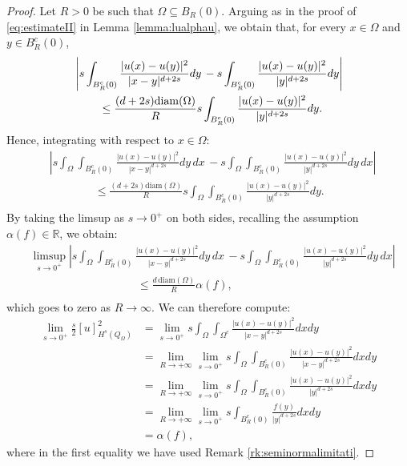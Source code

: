 \documentclass[reqno,11pt]{amsart}
\numberwithin{equation}{section}
\theoremstyle{definition} %
\theoremstyle{plain}
\theoremstyle{definition}
\theoremstyle{remark}
\def\sub{\subseteq}
\def\Qom{{Q_\Omega}}
\def\O{\Omega}
\def\semin#1#2{ [#1 ]_{#2}}
\def\R{\mathbb{R}}
\begin{document}
\begin{proof}%

Let $R>0$ be such that $\O\sub B_R(0)$. Arguing as in the proof of \eqref{eq:estimateII} in Lemma \ref{lemma:lualphau}, we obtain that, for every $x\in \O$ and $y\in B_R^c(0)$,
\begin{align*}
        &\left|s\int_{B_R^c(0)}\frac{|u(x)-u(y)|^2}{|x-y|^{d+2s}}dy\,-s\int_{B_R^c(0)}\frac{|u(x)-u(y)|^2}{|y|^{d+2s}}dy\right|\\&\hspace{8mm}\leq\frac{(d+2s)\mathrm{diam}(\O)}{R}s\int_{B_R^c(0)}\frac{|u(x)-u(y)|^2}{|y|^{d+2s}}dy.
\end{align*}
Hence, integrating with respect to $x\in\O$:
\begin{align*}
    &\left|s\int_\O\int_{B_R^c(0)}\frac{|u(x)-u(y)|^2}{|x-y|^{d+2s}}dy\,dx\,-s\int_\O\int_{B_R^c(0)}\frac{|u(x)-u(y)|^2}{|y|^{d+2s}}dy\,dx\right|\\&\qquad\qquad\leq\frac{(d+2s)\mathrm{diam}(\O)}{R}s\int_\O\int_{B_R^c(0)}\frac{|u(x)-u(y)|^2}{|y|^{d+2s}}dy.\\
\end{align*}
By taking the limsup as $s\to0^+$ on both sides, recalling the assumption $\alpha(f)\in\R$, we obtain:
\begin{align*}
     &\limsup_{s\to0^+}\left|s\int_\O\int_{B_R^c(0)}\frac{|u(x)-u(y)|^2}{|x-y|^{d+2s}}dy\,dx\,-s\int_\O\int_{B_R^c(0)}\frac{|u(x)-u(y)|^2}{|y|^{d+2s}}dy\,dx\right|\\&\hspace{4cm}\leq\frac{d\,\mathrm{diam}(\O)}{R}\alpha(f),\\
\end{align*}
which goes to zero as $R\to\infty$. We can therefore compute:
    \begin{align*}
         \lim_{s\to0^+}\frac{s}{2}\semin{u}{H^s(\Qom)}^2&=\lim_{s\to0^+}s\int_{\O}\int_{\O^c} \frac{|u(x)-u(y)|^2}{|x-y|^{d+2s}}dxdy \\
         &=\lim_{R\to +\infty}\lim_{s\to0^+}s\int_{\O}\int_{B_R^c(0)} \frac{|u(x)-u(y)|^2}{|x-y|^{d+2s}}dxdy \\
         &=\lim_{R\to +\infty}\lim_{s\to0^+}s\int_{\O}\int_{B_R^c(0)} \frac{|u(x)-u(y)|^2}{|y|^{d+2s}}dxdy\\
         &=\lim_{R\to +\infty}\lim_{s\to0^+}s\int_{B_R^c(0)} \frac{f(y)}{|y|^{d+2s}}dxdy\\
         &=\alpha(f),
    \end{align*}
    where in the first equality we have used Remark \ref{rk:seminormalimitati}.
\end{proof}
\end{document}
